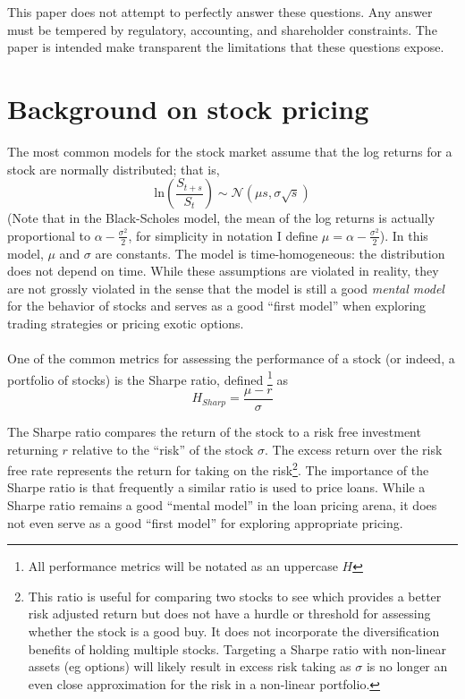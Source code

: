 \documentclass{article}
\begin{document}
This paper does not attempt to perfectly answer these questions.  Any answer must be tempered by regulatory, accounting, and shareholder constraints.  The paper is intended make transparent the limitations that these questions expose.  

\section{Background on stock pricing}

The most common models for the stock market assume that the log returns for a stock are normally distributed; that is,
\[\mathrm{ln}\left(\frac{S_{t+s}}{S_t}\right) \sim \mathcal{N}(\mu s, \sigma \sqrt{s})\]
(Note that in the Black-Scholes model, the mean of the log returns is actually proportional to \(\alpha-\frac{\sigma^2}{2}\), for simplicity in notation I define \(\mu=\alpha-\frac{\sigma^2}{2}\)).  In this model, \(\mu\) and \(\sigma\) are constants.  The model is time-homogeneous: the distribution does not depend on time.  While these assumptions are violated in reality, they are not grossly violated in the sense that the model is still a good \emph{mental model} for the behavior of stocks and serves as a good ``first model'' when exploring trading strategies or pricing exotic options.  
\\
\\
One of the common metrics for assessing the performance of a stock (or indeed, a portfolio of stocks) is the Sharpe ratio, defined \footnote{All performance metrics will be notated as an uppercase \(H\)} as 
\[H_{Sharp}=\frac{\mu-r}{\sigma}\]

The Sharpe ratio compares the return of the stock to a risk free investment returning \(r\) relative to the ``risk'' of the stock \(\sigma\).  The excess return over the risk free rate represents the return for taking on the risk\footnote{This ratio is useful for comparing two stocks to see which provides a better risk adjusted return but does not have a hurdle or threshold for assessing whether the stock is a good buy.  It does not incorporate the diversification benefits of holding multiple stocks.  Targeting a Sharpe ratio with non-linear assets (eg options) will likely result in excess risk taking as \(\sigma\) is no longer an even close approximation for the risk in a non-linear portfolio.}.  The importance of the Sharpe ratio is that frequently a similar ratio is used to price loans.  While a Sharpe ratio remains a good ``mental model'' in the loan pricing arena, it does not even serve as a good ``first model'' for exploring appropriate pricing.
\end{document}
